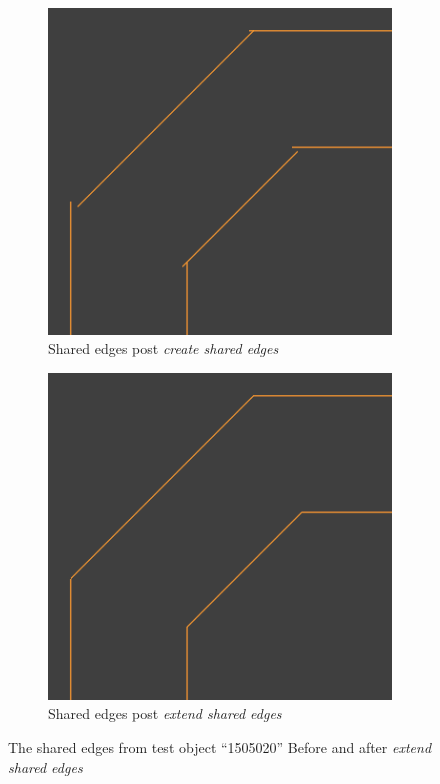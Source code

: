 \begin{figure}[htb]
	\centering
	\begin{subfigure}{0.45\textwidth}
		\centering
		\includegraphics[width=\linewidth]{../resources/geo_simp/1505020_shared_edges.png}
		\caption{Shared edges post \textit{create shared edges}}
		\label{sfig:gs_shared_edges}
	\end{subfigure}
	\hfill
	\begin{subfigure}{0.45\textwidth}
		\centering
		\includegraphics[width=\linewidth]{../resources/geo_simp/1505020_shared_edges_clamped.png}
		\caption{Shared edges post \textit{extend shared edges}}
		\label{sfig:gs_shared_edges_clamped}
	\end{subfigure}
\caption{
The shared edges from test object ``1505020'' Before and after \textit{extend shared edges}
}
	\label{fig:extend_shared_edges}
\end{figure}

